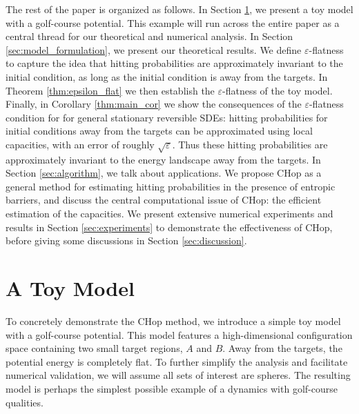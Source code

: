 \documentclass[english, aip, jcp, priprint, graphicx,floatfix]{revtex4-1}
\theoremstyle{plain}
\theoremstyle{definition}
\theoremstyle{plain}
\begin{document}
The rest of the paper is organized as follows. In Section \ref{sec:toy_model}, we present a toy model with a golf-course potential.  This example will run across the entire paper as a central thread for our theoretical and numerical analysis. In Section \ref{sec:model_formulation}, we present our theoretical results. We define $\varepsilon$-flatness to capture the idea that hitting probabilities are approximately invariant to the initial condition, as long as the initial condition is away from the targets.  In Theorem \ref{thm:epsilon_flat} we then establish the $\varepsilon$-flatness of the toy model. Finally, in Corollary \ref{thm:main_cor} we show the consequences of the $\varepsilon$-flatness condition for for general stationary reversible SDEs: hitting probabilities for initial conditions away from the targets can be approximated using local capacities, with an error of roughly $\sqrt\varepsilon$.  Thus these hitting probabilities are approximately invariant to the energy landscape away from the targets.  In Section \ref{sec:algorithm}, we talk about applications. We propose CHop as a general method for estimating hitting probabilities in the presence of entropic barriers, and discuss the central computational issue of CHop: the efficient estimation of the capacities. We present extensive numerical experiments and results in Section \ref{sec:experiments} to demonstrate the effectiveness of CHop, before giving some discussions in Section \ref{sec:discussion}.


\section{A Toy Model}\label{sec:toy_model}

To concretely demonstrate the CHop method, we introduce a simple toy model with a golf-course potential.  This model features a high-dimensional configuration space containing two small target regions, $A$ and $B$.  Away from the targets, the potential energy is completely flat.  To further simplify the analysis and facilitate numerical validation, we will assume all sets of interest are spheres.  The resulting model is perhaps the simplest possible example of a dynamics with golf-course qualities.  
\end{document}
